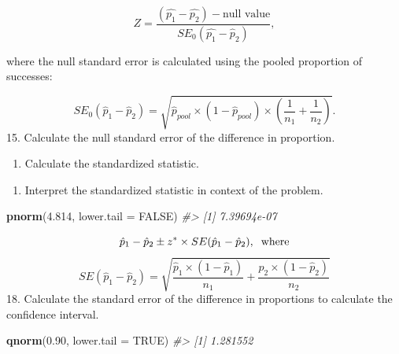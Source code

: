 \documentclass[
]{report}
\newenvironment{Shaded}{\begin{snugshade}}{\end{snugshade}}
\newcommand{\AttributeTok}[1]{\textcolor[rgb]{0.13,0.29,0.53}{#1}}
\newcommand{\CommentTok}[1]{\textcolor[rgb]{0.56,0.35,0.01}{\textit{#1}}}
\newcommand{\ConstantTok}[1]{\textcolor[rgb]{0.56,0.35,0.01}{#1}}
\newcommand{\FloatTok}[1]{\textcolor[rgb]{0.00,0.00,0.81}{#1}}
\newcommand{\FunctionTok}[1]{\textcolor[rgb]{0.13,0.29,0.53}{\textbf{#1}}}
\newcommand{\NormalTok}[1]{#1}
\providecommand{\tightlist}{%
  \setlength{\itemsep}{0pt}\setlength{\parskip}{0pt}}
\begin{document}
\[
Z = \frac{(\hat{p_1} - \hat{p_2}) - \text{null value}}{SE_0(\hat{p_1}-\hat{p}_2)},
\]

where the null standard error is calculated using the pooled proportion of successes:

\[
SE_0(\hat{p}_1-\hat{p}_2)=\sqrt{\hat{p}_{pool}\times (1-\hat{p}_{pool})\times \left(\frac{1}{n_1}+\frac{1}{n_2}\right)}.
\]
15. Calculate the null standard error of the difference in proportion.

\vspace{1in}

\begin{enumerate}
\def\labelenumi{\arabic{enumi}.}
\setcounter{enumi}{15}
\tightlist
\item
  Calculate the standardized statistic.
\end{enumerate}

\vspace{1in}

\begin{enumerate}
\def\labelenumi{\arabic{enumi}.}
\setcounter{enumi}{16}
\tightlist
\item
  Interpret the standardized statistic in context of the problem.
\end{enumerate}

\vspace{1in}

\begin{Shaded}
\begin{Highlighting}[]
\FunctionTok{pnorm}\NormalTok{(}\FloatTok{4.814}\NormalTok{, }\AttributeTok{lower.tail =} \ConstantTok{FALSE}\NormalTok{)}
\CommentTok{\#\textgreater{} [1] 7.39694e{-}07}
\end{Highlighting}
\end{Shaded}

\newpage

\[\hat{p}_1-\hat{p}_2\pm z^*\times SE(\hat{p}_1-\hat{p}_2), \hspace{.2cm} \text{where}\]
\[SE(\hat{p}_1-\hat{p}_2) = \sqrt{\frac{\hat{p}_1 \times  (1-\hat{p}_1)}{n_1}+\frac{\hat{p}_2 \times  (1-\hat{p}_2)}{n_2}}\]
18. Calculate the standard error of the difference in proportions to calculate the confidence interval.

\vspace{1in}

\begin{Shaded}
\begin{Highlighting}[]
\FunctionTok{qnorm}\NormalTok{(}\FloatTok{0.90}\NormalTok{, }\AttributeTok{lower.tail =} \ConstantTok{TRUE}\NormalTok{)}
\CommentTok{\#\textgreater{} [1] 1.281552}
\end{Highlighting}
\end{Shaded}
\end{document}

